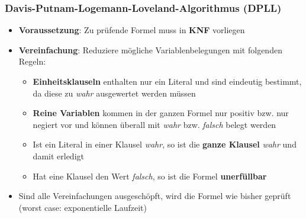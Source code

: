 \subsubsection{Davis-Putnam-Logemann-Loveland-Algorithmus (DPLL)}%
\label{ssub:davis_putnam_logemann_loveland_algorithmus}
\begin{itemize}
	\item \textbf{Voraussetzung}: Zu prüfende Formel muss in \textbf{KNF} vorliegen
	\item \textbf{Vereinfachung}: Reduziere mögliche Variablenbelegungen mit folgenden Regeln:
	\begin{itemize}
		\item \textbf{Einheitsklauseln} enthalten nur ein Literal und sind eindeutig bestimmt, da diese zu \textit{wahr} ausgewertet werden müssen
		\item \textbf{Reine Variablen} kommen in der ganzen Formel nur positiv bzw. nur negiert vor und können überall mit \textit{wahr} bzw. \textit{falsch} belegt werden
		\item Ist ein Literal in einer Klausel \textit{wahr}, so ist die \textbf{ganze Klausel} \textit{wahr} und damit erledigt
		\item Hat eine Klausel den Wert \textit{falsch}, so ist die Formel \textbf{unerfüllbar}
	\end{itemize}
	\item Sind alle Vereinfachungen ausgeschöpft, wird die Formel wie bisher geprüft (worst case: exponentielle Laufzeit)
\end{itemize}